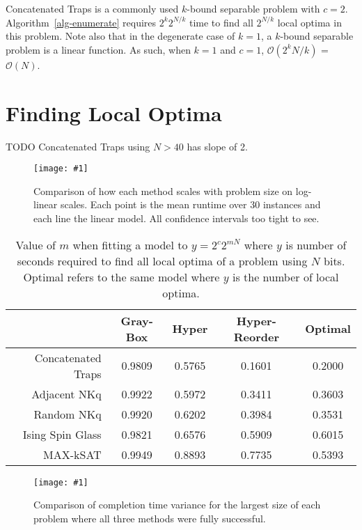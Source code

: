 \documentclass[runningheads,a4paper]{llncs}
\newcommand{\includegraphicsfit}[1]
{\texttt{[image: \#1]}}
\newcommand{\BigO}[1]{$\mathcal{O}{(#1)}$}
\begin{document}
Concatenated Traps is a commonly used $k$-bound separable problem
with $c=2$.  Algorithm~\ref{alg-enumerate} requires $2^k2^{N/k}$ time
to find all $2^{N/k}$ local optima in this problem. Note also that
in the degenerate case of $k=1$, a $k$-bound separable problem
is a linear function. As such, when $k=1$ and $c=1$,
\BigO{2^kN/k} = \BigO{N}.

\section{Finding Local Optima}
TODO Concatenated Traps using $N>40$ has slope of 2.
\begin{figure*}
  \centering
  \includegraphicsfit{length-method}
  \caption{Comparison of how each method scales with problem size on log-linear scales. Each point is the mean
           runtime over 30 instances and each line the linear model. All confidence intervals too tight to see.}
  \label{fig-length-method}
\end{figure*}

\begin{table}
	\centering
	\caption{Value of $m$ when fitting a model to $y = 2^c2^{mN}$ where $y$ is number of seconds required to
	         find all local optima of a problem using $N$ bits. Optimal refers to the same model where
	         $y$ is the number of local optima.}
	\begin{tabular}{|r|c|c|c|c|}
	  \hline
	    & \textbf{Gray-Box} & \textbf{Hyper} & \textbf{Hyper-Reorder} & \textbf{Optimal} \\ \hline
	  Concatenated Traps & 0.9809 & 0.5765 & 0.1601 & 0.2000 \\ \hline
    Adjacent NKq & 0.9922 & 0.5972 & 0.3411 & 0.3603 \\ \hline
    Random NKq & 0.9920 & 0.6202 & 0.3984 & 0.3531 \\ \hline
    Ising Spin Glass & 0.9821 & 0.6576 & 0.5909 & 0.6015 \\ \hline
    MAX-kSAT & 0.9949 & 0.8893 & 0.7735 & 0.5393 \\ \hline
  \end{tabular}
  \label{table-results}
\end{table}


\begin{figure*}
  \centering
  \includegraphicsfit{boxplot-method}
  \caption{Comparison of completion time variance for the largest size of each problem
           where all three methods were fully successful.}
  \label{fig-boxplot-method}
\end{figure*}
\end{document}
